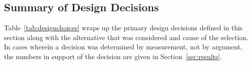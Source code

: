 \documentclass[journal]{IEEEtran}
\begin{document}
\iffalse
\subsection{Summary of Design Decisions}

Table~\ref{tab:designchoices} wraps up the primary design decisions defined in this
section along with the alternative that was considered and cause of the selection. In
cases wherein a decision was determined by measurement, not by argument, the numbers
in support of the decision are given in Section~\ref{sec:results}.
\end{document}
